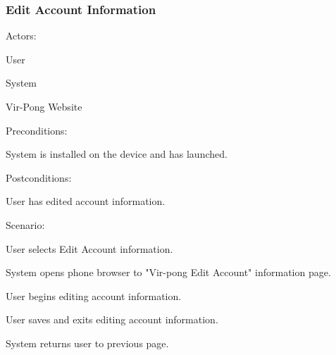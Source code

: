 \documentclass[12pt]{article}
\newenvironment{itemize*}%
  {\begin{itemize}%
  	\setlength{\parsep}{0pt}
    \setlength{\itemsep}{0pt}%
    \setlength{\parskip}{0pt}}%
  {\end{itemize}}
\newenvironment{enumerate*}%
  {\begin{enumerate}%
  	\setlength{\parsep}{0pt}
    \setlength{\itemsep}{0pt}%
    \setlength{\parskip}{0pt}}%
  {\end{enumerate}}
\begin{document}
\subsubsection*{Edit Account Information}
Actors:
\begin{itemize*}
\item User
\item System
\item Vir-Pong Website
\end{itemize*}
Preconditions:
\begin{itemize*}
\item System is installed on the device and has launched.
\end{itemize*}
Postconditions:
\begin{itemize*}
\item User has edited account information.
\end{itemize*}
Scenario:
\begin{enumerate*}
\item User selects Edit Account information.
\item \label{Browser}System opens phone browser to "Vir-pong Edit Account" information page. 
\item User begins editing account information.
\item User saves and exits editing account information.
\item System returns user to previous page.
\end{enumerate*} 

\onehalfspacing


\end{document}
